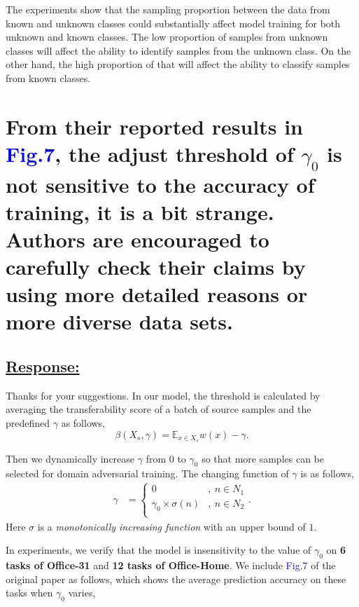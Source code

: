 The experiments show that the sampling proportion between the data from known and unknown classes could substantially affect model training for both unknown and known classes.
The low proportion of samples from unknown classes will affect the ability to identify samples from the unknown class.
On the other hand, the high proportion of that will affect the ability to classify samples from known classes.

\section*{From their reported results in \textcolor{blue}{Fig.7}, the adjust threshold of $\gamma_0$ is not sensitive to the accuracy of training, it is a bit strange.  Authors are encouraged to carefully check their claims by using more detailed reasons or more diverse data sets. }
\subsection*{\underline{\textbf{Response:}}}

Thanks for your suggestions.
In our model, the threshold is calculated by averaging the transferability score of a batch of source samples and the predefined $\gamma$ as follows,
\begin{equation}
    \label{eq: transferability thresholded}
    \beta(X_s, \gamma) = \mathbb{E}_{x \in X_s} w(x) - \gamma.
\end{equation}

Then we dynamically increase $\gamma$ from $0$ to $\gamma_0$ so that more samples can be selected for domain adversarial training.
The changing function of $\gamma$ is as follows,
\begin{equation}
    \label{eq: dynamic tolerable range}
    \begin{split}
        \gamma &=
        \begin{cases}
            0 & ,\: n \in N_1 \\
            \gamma_0 \times  \sigma(n) & ,\: n\in N_2 \\
        \end{cases}.
    \end{split}
\end{equation}
Here $\sigma$ is a \textit{monotonically increasing function} with an upper bound of $1$.

In experiments, we verify that the model is insensitivity to the value of $\gamma_0$ on \textbf{6 tasks of Office-31} and \textbf{12 tasks of Office-Home}.
We include \textcolor{blue}{Fig.7} of the original paper as follows, which shows the average prediction accuracy on these tasks when $\gamma_0$ varies,


